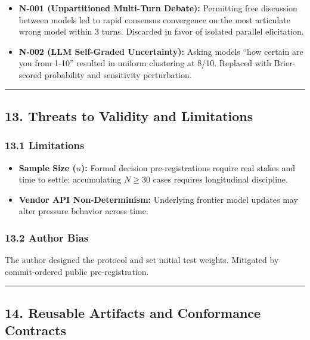 \documentclass[
]{article}
\providecommand{\tightlist}{%
  \setlength{\itemsep}{0pt}\setlength{\parskip}{0pt}}
\begin{document}
\begin{itemize}
\tightlist
\item
  \textbf{N-001 (Unpartitioned Multi-Turn Debate):} Permitting free
  discussion between models led to rapid consensus convergence on the
  most articulate wrong model within 3 turns. Discarded in favor of
  isolated parallel elicitation.
\item
  \textbf{N-002 (LLM Self-Graded Uncertainty):} Asking models ``how
  certain are you from 1-10'' resulted in uniform clustering at 8/10.
  Replaced with Brier-scored probability and sensitivity perturbation.
\end{itemize}

\begin{center}\rule{0.5\linewidth}{0.5pt}\end{center}

\subsection{13. Threats to Validity and
Limitations}\label{threats-to-validity-and-limitations}

\subsubsection{13.1 Limitations}\label{limitations}

\begin{itemize}
\tightlist
\item
  \textbf{Sample Size (\(n\)):} Formal decision pre-registrations
  require real stakes and time to settle; accumulating \(N \ge 30\)
  cases requires longitudinal discipline.
\item
  \textbf{Vendor API Non-Determinism:} Underlying frontier model updates
  may alter pressure behavior across time.
\end{itemize}

\subsubsection{13.2 Author Bias}\label{author-bias}

The author designed the protocol and set initial test weights. Mitigated
by commit-ordered public pre-registration.

\begin{center}\rule{0.5\linewidth}{0.5pt}\end{center}

\subsection{14. Reusable Artifacts and Conformance
Contracts}\label{reusable-artifacts-and-conformance-contracts}
\end{document}
